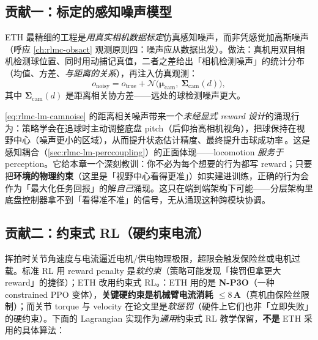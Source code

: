 \subsection{贡献一：标定的感知噪声模型}
\label{sec:rlmc-lm-eth-noise}

ETH 最精细的工程是\emph{用真实相机数据标定}仿真感知噪声，而非凭感觉加高斯噪声（呼应 \cref{ch:rlmc-obsact} 观测原则四：噪声应从数据出发）。做法：真机用双目相机检测球位置、同时用动捕记真值，二者之差给出「相机检测噪声」的统计分布（均值、方差、\emph{与距离的关系}），再注入仿真观测：
\begin{equation}
o_{\text{noisy}} = o_{\text{true}} + \mathcal N\!\big(\boldsymbol\mu_{\text{cam}},\ \boldsymbol\Sigma_{\text{cam}}(d)\big),
\label{eq:rlmc-lm-camnoise}
\end{equation}
其中 $\boldsymbol\Sigma_{\text{cam}}(d)$ 是距离相关协方差——远处的球检测噪声更大。

\begin{insight}\label{ins:rlmc-lm-active}
\cref{eq:rlmc-lm-camnoise} 的距离相关噪声带来一个\emph{未经显式 reward 设计}的涌现行为：策略学会在追球时主动调整底盘 pitch（后仰抬高相机视角），把球保持在视野中心（噪声更小的区域），从而提升状态估计精度、最终提升击球成功率\,\cite{ma2025badminton}。这是感知耦合（\cref{sec:rlmc-lm-perccoupling}）的正面体现——locomotion \emph{服务于} perception。它给本章一个深刻教训：你不必为每个想要的行为都写 reward；只要把\textbf{环境的物理约束}（这里是「视野中心看得更准」）如实建进训练，正确的行为会作为「最大化任务回报」的解\emph{自己}涌现。这只在端到端架构下可能——分层架构里底盘控制器拿不到「看得准不准」的信号，无从涌现这种跨模块协调。
\end{insight}

\subsection{贡献二：约束式 RL（硬约束电流）}
\label{sec:rlmc-lm-eth-crl}

挥拍时关节角速度与电流逼近电机/供电物理极限，超限会触发保险丝或电机过载。标准 RL 用 reward penalty 是\emph{软约束}（策略可能发现「挨罚但拿更大 reward」的捷径）；ETH 改用约束式 RL。：ETH 用的是 \textbf{N-P3O}（一种 constrained PPO 变体），\textbf{关键硬约束是机械臂电流消耗 $\le 8\,$A}（真机由保险丝限制）；而关节 torque 与 velocity 在论文里是\emph{软惩罚}（硬件上它们也非「立即失败」的硬约束）。下面的 Lagrangian 实现作为\emph{通用}约束式 RL 教学保留，\textbf{不是} ETH 采用的具体算法：

